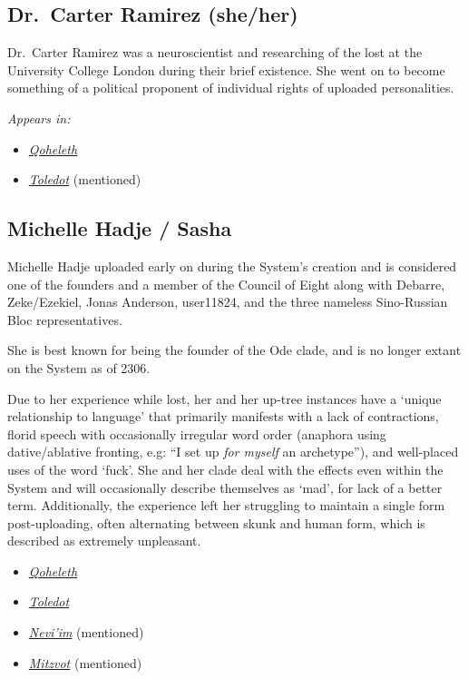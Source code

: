 \subsection{Dr.~Carter Ramirez (she/her)}

Dr.~Carter Ramirez was a neuroscientist and researching of the lost at the University College London during their brief existence. She went on to become something of a political proponent of individual rights of uploaded personalities.

\emph{Appears in:}

\begin{itemize}
\tightlist
\item
  \href{https://qoheleth.post-self.ink}{\emph{Qoheleth}}
\item
  \href{https://toledot.post-self.ink}{\emph{Toledot}} (mentioned)
\end{itemize}

\subsection{\texorpdfstring{Michelle Hadje{ / Sasha}}{Michelle Hadje / Sasha}}

Michelle Hadje uploaded early on during the System's creation and is considered one of the founders and a member of the Council of Eight along with Debarre, Zeke/Ezekiel, Jonas Anderson, user11824, and the three nameless Sino-Russian Bloc representatives.

She is best known for being the founder of the Ode clade, and is no longer extant on the System as of 2306.

Due to her experience while lost, her and her up-tree instances have a `unique relationship to language' that primarily manifests with a lack of contractions, florid speech with occasionally irregular word order (anaphora using dative/ablative fronting, e.g: ``I set up \emph{for myself} an archetype''), and well-placed uses of the word `fuck'. She and her clade deal with the effects even within the System and will occasionally describe themselves as `mad', for lack of a better term. {Additionally, the experience left her struggling to maintain a single form post-uploading, often alternating between skunk and human form, which is described as extremely unpleasant.}

\begin{itemize}
\tightlist
\item
  \href{https://qoheleth.post-self.ink}{\emph{Qoheleth}}
\item
  \href{https://toledot.post-self.ink}{\emph{Toledot}}
\item
  \href{https://neviim.post-self.ink}{\emph{Nevi'im}} (mentioned)
\item
  \href{https://mitzvot.post-self.ink}{\emph{Mitzvot}} (mentioned)
\end{itemize}

